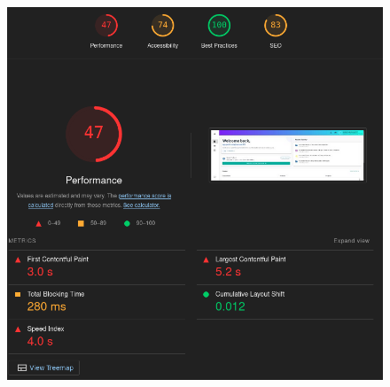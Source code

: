 \begin{figure}[H]
\begin{minipage}{0.45\textwidth}
  \includegraphics[width=\linewidth]{images/lighthouse_course_page_eval.png}
\end{minipage}

\vspace{1em}


\end{figure}
